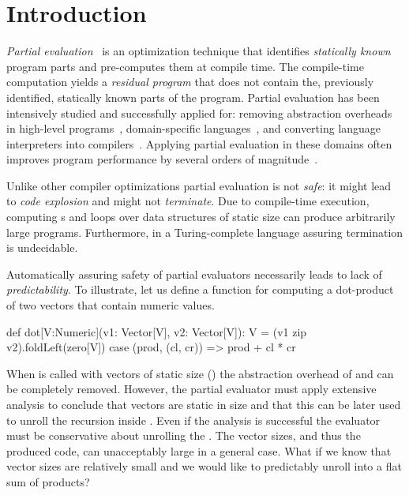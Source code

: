 \section{Introduction}
\label{sct:introduction}

\emph{Partial evaluation}~\cite{jones1993partial} is an optimization technique
that identifies \emph{statically known} program parts and pre-computes them at
compile time. The compile-time computation yields a \emph{residual program} that
does not contain the, previously identified, statically known parts of the
program.  Partial evaluation has been intensively studied and successfully
applied for: removing abstraction overheads in high-level
programs~\cite{carette2005multi,rompf2012lightweight}, domain-specific
languages~\cite{brady2010,jonnalagedda2014staged}, and converting language
interpreters into compilers~\cite{futamura1999partial,lancet,wurthinger2013one}.
Applying partial evaluation in these domains often improves program performance
by several orders of magnitude~\cite{shali2011Hybrid,brady2010}.

Unlike other compiler optimizations partial evaluation is not \emph{safe}: it
 might lead to \emph{code explosion} and might not \emph{terminate}. Due to
 compile-time execution,  computing s and loops over data structures
 of static size can produce arbitrarily  large programs. Furthermore, in a
 Turing-complete language assuring termination is undecidable.

Automatically assuring safety of partial evaluators necessarily leads to
 lack of \emph{predictability}. To illustrate, let us define a function
  for computing a dot-product of two vectors that contain numeric values\footnotemark[1].


\vspace{1.8mm}
\begin{listing}
  def dot[V:Numeric](v1: Vector[V], v2: Vector[V]): V =
    (v1 zip v2).foldLeft(zero[V]){ case (prod, (cl, cr)) =>
      prod + cl * cr
    }
\end{listing}
\vspace{1.8mm}

When  is called with vectors of static size (\eg {}) the abstraction overhead of  and 
 can be completely removed. However, the partial evaluator must apply extensive
 analysis to conclude that vectors are static in size and that this can be later
 used to unroll the recursion inside . Even if the analysis is
 successful the evaluator must be conservative about unrolling the
 . The vector sizes, and thus the produced code, can unacceptably
 large in a general case. What if we know that vector sizes are relatively small
 and we would like to predictably unroll   into a flat sum of products?



